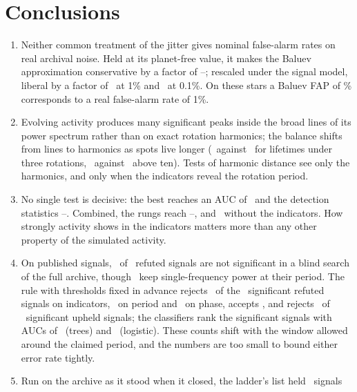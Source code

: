 \section{Conclusions}
\label{sec:conc}

\begin{enumerate}
\item Neither common treatment of the jitter gives nominal false-alarm rates on real
      archival noise. Held at its planet-free value, it makes the Baluev approximation
      conservative by a factor of \nmFapFixFactorLo--\nmFapFixFactorHi; rescaled under the
      signal model, liberal by a factor of \nmFapLiberalPerm\ at 1\% and
      \nmFapLiberalPermTenth\ at 0.1\%. On these stars a Baluev FAP of \nmFapEmpOne\%
      corresponds to a real false-alarm rate of 1\%.
\item Evolving activity produces many significant peaks inside the broad lines of its
      power spectrum rather than on exact rotation harmonics; the balance shifts from
      lines to harmonics as spots live longer (\nmLineShort\ against \nmHarmShort\ for
      lifetimes under three rotations, \nmLineLong\ against \nmHarmLong\ above ten). Tests of
      harmonic distance see only the harmonics, and only when the indicators reveal the
      rotation period.
\item No single test is decisive: the best reaches an AUC of \nmAucInd\ and the detection
      statistics \nmAucFap--\nmAucDchi. Combined, the rungs reach \nmAucLog--\nmAucTree, and
      \nmAucNoInd\ without the indicators. How strongly activity shows in the indicators
      matters more than any other property of the simulated activity.
\item On published signals, \nmRefNotDet\ of \nmBenchR\ refuted signals are not
      significant in a blind search of the full archive, though \nmRefDetSingle\ keep
      single-frequency power at their period. The rule with thresholds fixed in advance rejects
      \nmRefFFInd\ of the \nmBRuleRefN\ significant refuted signals on indicators,
      \nmRefFFPeriod\ on period and \nmRefFFPhase\ on phase, accepts \nmBRuleRefAcc, and rejects \nmBRuleUpRej\ of \nmBRuleUpN\
      significant upheld signals; the classifiers rank the significant signals with AUCs
      of \nmBAucTree\ (trees) and \nmBAucLog\ (logistic). These counts shift with the window
      allowed around the claimed period, and the numbers are too small to bound either
      error rate tightly.
\item Run on the archive as it stood when it closed, the ladder's list held \nmTsHits\ signals

\end{enumerate}
